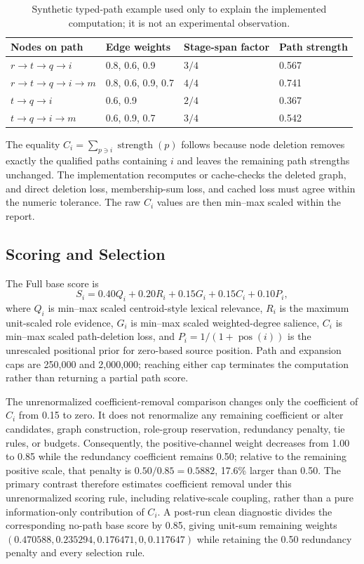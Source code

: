 \documentclass[information,article,submit,moreauthors]{Definitions/mdpi}
\begin{document}
\begin{table}[H]
\caption{Synthetic typed-path example used only to explain the implemented computation; it is not an experimental observation.}
\label{tab:toy-path}\centering\small
\begin{tabular}{llll}
\toprule
Nodes on path & Edge weights & Stage-span factor & Path strength\\
\midrule
$r\rightarrow t\rightarrow q\rightarrow i$ & 0.8, 0.6, 0.9 & $3/4$ & 0.567\\
$r\rightarrow t\rightarrow q\rightarrow i\rightarrow m$ & 0.8, 0.6, 0.9, 0.7 & $4/4$ & 0.741\\
$t\rightarrow q\rightarrow i$ & 0.6, 0.9 & $2/4$ & 0.367\\
$t\rightarrow q\rightarrow i\rightarrow m$ & 0.6, 0.9, 0.7 & $3/4$ & 0.542\\
\bottomrule
\end{tabular}
\end{table}

The equality $C_i=\sum_{p\ni i}\operatorname{strength}(p)$ follows because node deletion removes exactly the qualified paths containing $i$ and leaves the remaining path strengths unchanged. The implementation recomputes or cache-checks the deleted graph, and direct deletion loss, membership-sum loss, and cached loss must agree within the numeric tolerance. The raw $C_i$ values are then min--max scaled within the report.

\subsection{Scoring and Selection}

The Full base score is
\begin{equation}
S_i=0.40Q_i+0.20R_i+0.15G_i+0.15C_i+0.10P_i,
\label{eq:full-score}
\end{equation}
where $Q_i$ is min--max scaled centroid-style lexical relevance, $R_i$ is the maximum unit-scaled role evidence, $G_i$ is min--max scaled weighted-degree salience, $C_i$ is min--max scaled path-deletion loss, and $P_i=1/(1+\operatorname{pos}(i))$ is the unrescaled positional prior for zero-based source position. Path and expansion caps are 250,000 and 2,000,000; reaching either cap terminates the computation rather than returning a partial path score.

The unrenormalized coefficient-removal comparison changes only the coefficient of $C_i$ from 0.15 to zero. It does not renormalize any remaining coefficient or alter candidates, graph construction, role-group reservation, redundancy penalty, tie rules, or budgets. Consequently, the positive-channel weight decreases from 1.00 to 0.85 while the redundancy coefficient remains 0.50; relative to the remaining positive scale, that penalty is $0.50/0.85=0.5882$, 17.6\% larger than 0.50. The primary contrast therefore estimates coefficient removal under this unrenormalized scoring rule, including relative-scale coupling, rather than a pure information-only contribution of $C_i$. A post-run clean diagnostic divides the corresponding no-path base score by 0.85, giving unit-sum remaining weights $(0.470588,0.235294,0.176471,0,0.117647)$ while retaining the 0.50 redundancy penalty and every selection rule.
\end{document}
